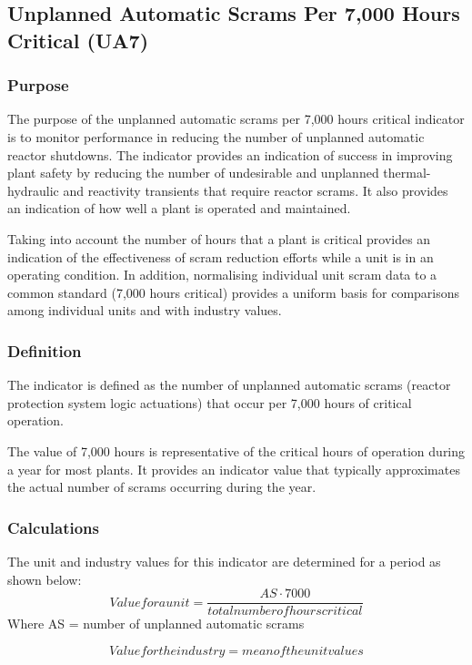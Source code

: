 \subsection{Unplanned Automatic Scrams Per 7,000 Hours Critical (UA7)}

\subsubsection{Purpose}

The purpose of the unplanned automatic scrams per 7,000 hours critical
indicator is to monitor performance in reducing the number of
unplanned automatic reactor shutdowns. The indicator provides an
indication of success in improving plant safety by reducing the number
of undesirable and unplanned thermal-hydraulic and reactivity
transients that require reactor scrams. It also provides an indication
of how well a plant is operated and maintained. 

Taking into account the number of hours that a plant is critical
provides an indication of the effectiveness of scram reduction efforts
while a unit is in an operating condition. In addition, normalising
individual unit scram data to a common standard (7,000 hours critical)
provides a uniform basis for comparisons among individual units and
with industry values. 

\subsubsection{Definition}

The indicator is defined as the number of unplanned automatic scrams
(reactor protection system logic actuations) that occur per 7,000
hours of critical operation.
 
The value of 7,000 hours is representative of the critical hours of
operation during a year for most plants. It provides an indicator
value that typically approximates the actual number of scrams
occurring during the year.

\subsubsection{Calculations}

The unit and industry values for this indicator are determined for a period as shown below:  
$$ Value for a unit = \frac{AS \cdot 7000}{total number of hours critical} $$	
Where 	AS = number of unplanned automatic scrams

$$ Value for the industry = mean of the unit values $$

